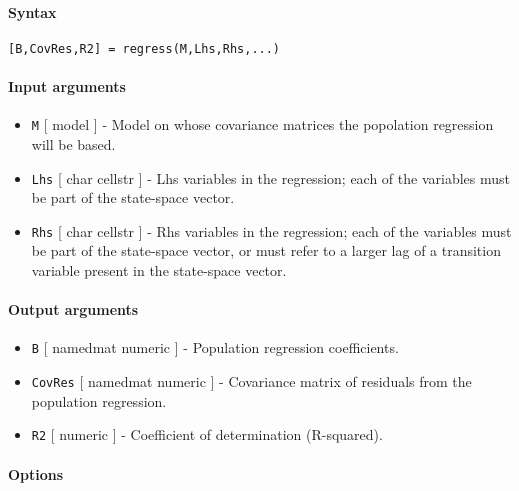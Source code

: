 


	\paragraph{Syntax}\label{syntax}

\begin{verbatim}
[B,CovRes,R2] = regress(M,Lhs,Rhs,...)
\end{verbatim}

\paragraph{Input arguments}\label{input-arguments}

\begin{itemize}
\item
  \texttt{M} {[} model {]} - Model on whose covariance matrices the
  popolation regression will be based.
\item
  \texttt{Lhs} {[} char \textbar{} cellstr {]} - Lhs variables in the
  regression; each of the variables must be part of the state-space
  vector.
\item
  \texttt{Rhs} {[} char \textbar{} cellstr {]} - Rhs variables in the
  regression; each of the variables must be part of the state-space
  vector, or must refer to a larger lag of a transition variable present
  in the state-space vector.
\end{itemize}

\paragraph{Output arguments}\label{output-arguments}

\begin{itemize}
\item
  \texttt{B} {[} namedmat \textbar{} numeric {]} - Population regression
  coefficients.
\item
  \texttt{CovRes} {[} namedmat \textbar{} numeric {]} - Covariance
  matrix of residuals from the population regression.
\item
  \texttt{R2} {[} numeric {]} - Coefficient of determination
  (R-squared).
\end{itemize}

\paragraph{Options}\label{options}

